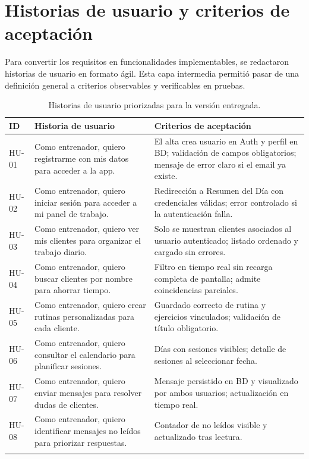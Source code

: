 \section{Historias de usuario y criterios de aceptación}

Para convertir los requisitos en funcionalidades implementables, se redactaron historias de usuario en formato ágil. Esta capa intermedia permitió pasar de una definición general a criterios observables y verificables en pruebas.

\begin{longtable}{@{}p{1.3cm}p{5.5cm}p{6.7cm}@{}}
\toprule
\textbf{ID} & \textbf{Historia de usuario} & \textbf{Criterios de aceptación} \\
\midrule
\endhead
HU-01 & Como entrenador, quiero registrarme con mis datos para acceder a la app. & El alta crea usuario en Auth y perfil en BD; validación de campos obligatorios; mensaje de error claro si el email ya existe. \\
HU-02 & Como entrenador, quiero iniciar sesión para acceder a mi panel de trabajo. & Redirección a Resumen del Día con credenciales válidas; error controlado si la autenticación falla. \\
HU-03 & Como entrenador, quiero ver mis clientes para organizar el trabajo diario. & Solo se muestran clientes asociados al usuario autenticado; listado ordenado y cargado sin errores. \\
HU-04 & Como entrenador, quiero buscar clientes por nombre para ahorrar tiempo. & Filtro en tiempo real sin recarga completa de pantalla; admite coincidencias parciales. \\
HU-05 & Como entrenador, quiero crear rutinas personalizadas para cada cliente. & Guardado correcto de rutina y ejercicios vinculados; validación de título obligatorio. \\
HU-06 & Como entrenador, quiero consultar el calendario para planificar sesiones. & Días con sesiones visibles; detalle de sesiones al seleccionar fecha. \\
HU-07 & Como entrenador, quiero enviar mensajes para resolver dudas de clientes. & Mensaje persistido en BD y visualizado por ambos usuarios; actualización en tiempo real. \\
HU-08 & Como entrenador, quiero identificar mensajes no leídos para priorizar respuestas. & Contador de no leídos visible y actualizado tras lectura. \\
\bottomrule
\caption{Historias de usuario priorizadas para la versión entregada.}
\end{longtable}

